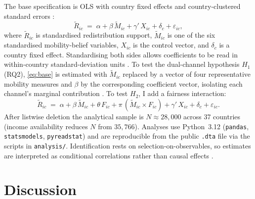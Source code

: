 \documentclass[11pt,a4paper]{article}
\begin{document}
The base specification is OLS with country fixed effects and country-clustered
standard errors \citep{cameron2015practitioner, abadie2023should}:
\begin{equation}
\widetilde{R}_{ic} \;=\; \alpha + \beta\,\widetilde{M}_{ic} + \gamma'\,X_{ic}
+ \delta_{c} + \varepsilon_{ic},
\label{eq:base}
\end{equation}
where $\widetilde{R}_{ic}$ is standardised redistribution support, $\widetilde{M}_{ic}$
is one of the six standardised mobility-belief variables, $X_{ic}$ is the control
vector, and $\delta_{c}$ is a country fixed effect. Standardising both sides allows
coefficients to be read in within-country standard-deviation units
\citep{alesina2018intergenerational}. To test the dual-channel hypothesis $H_{1}$
(RQ2), \cref{eq:base} is estimated with $\widetilde{M}_{ic}$ replaced by a vector of
four representative mobility measures and $\beta$ by the corresponding coefficient
vector, isolating each channel's marginal contribution \citep{stantcheva2021perceptions}. To test
$H_{2}$, I add a fairness interaction:
\begin{equation}
\widetilde{R}_{ic} \;=\; \alpha + \beta\,\widetilde{M}_{ic} + \theta\,F_{ic}
+ \pi\,(\widetilde{M}_{ic}{\times}F_{ic}) + \gamma'\,X_{ic} + \delta_{c}
+ \varepsilon_{ic}.
\label{eq:int}
\end{equation}
After listwise deletion the analytical sample is $N{\approx}28{,}000$ across 37
countries (income availability reduces $N$ from $35{,}766$). Analyses use Python~3.12
(\texttt{pandas}, \texttt{statsmodels}, \texttt{pyreadstat}) and are reproducible from
the public \texttt{.dta} file via the scripts in \texttt{analysis/}. Identification
rests on selection-on-observables, so estimates are interpreted as conditional
correlations rather than causal effects \citep{benabou2006belief}.



\section{Discussion}
\end{document}
